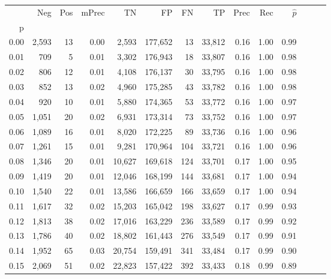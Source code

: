 \begin{tabular}{rrrrrrrrrrrrrr}
\toprule
{} &    Neg &  Pos & mPrec &       TN &       FP &      FN &      TP &  Prec &   Rec & $\hat{p}$ \\
p    &        &      &       &          &          &         &         &       &       &           \\
\midrule
0.00 &  2,593 &   13 &  0.00 &    2,593 &  177,652 &      13 &  33,812 &  0.16 &  1.00 &      0.99 \\
0.01 &    709 &    5 &  0.01 &    3,302 &  176,943 &      18 &  33,807 &  0.16 &  1.00 &      0.98 \\
0.02 &    806 &   12 &  0.01 &    4,108 &  176,137 &      30 &  33,795 &  0.16 &  1.00 &      0.98 \\
0.03 &    852 &   13 &  0.02 &    4,960 &  175,285 &      43 &  33,782 &  0.16 &  1.00 &      0.98 \\
0.04 &    920 &   10 &  0.01 &    5,880 &  174,365 &      53 &  33,772 &  0.16 &  1.00 &      0.97 \\
0.05 &  1,051 &   20 &  0.02 &    6,931 &  173,314 &      73 &  33,752 &  0.16 &  1.00 &      0.97 \\
0.06 &  1,089 &   16 &  0.01 &    8,020 &  172,225 &      89 &  33,736 &  0.16 &  1.00 &      0.96 \\
0.07 &  1,261 &   15 &  0.01 &    9,281 &  170,964 &     104 &  33,721 &  0.16 &  1.00 &      0.96 \\
0.08 &  1,346 &   20 &  0.01 &   10,627 &  169,618 &     124 &  33,701 &  0.17 &  1.00 &      0.95 \\
0.09 &  1,419 &   20 &  0.01 &   12,046 &  168,199 &     144 &  33,681 &  0.17 &  1.00 &      0.94 \\
0.10 &  1,540 &   22 &  0.01 &   13,586 &  166,659 &     166 &  33,659 &  0.17 &  1.00 &      0.94 \\
0.11 &  1,617 &   32 &  0.02 &   15,203 &  165,042 &     198 &  33,627 &  0.17 &  0.99 &      0.93 \\
0.12 &  1,813 &   38 &  0.02 &   17,016 &  163,229 &     236 &  33,589 &  0.17 &  0.99 &      0.92 \\
0.13 &  1,786 &   40 &  0.02 &   18,802 &  161,443 &     276 &  33,549 &  0.17 &  0.99 &      0.91 \\
0.14 &  1,952 &   65 &  0.03 &   20,754 &  159,491 &     341 &  33,484 &  0.17 &  0.99 &      0.90 \\
0.15 &  2,069 &   51 &  0.02 &   22,823 &  157,422 &     392 &  33,433 &  0.18 &  0.99 &      0.89 \\

\end{tabular}
